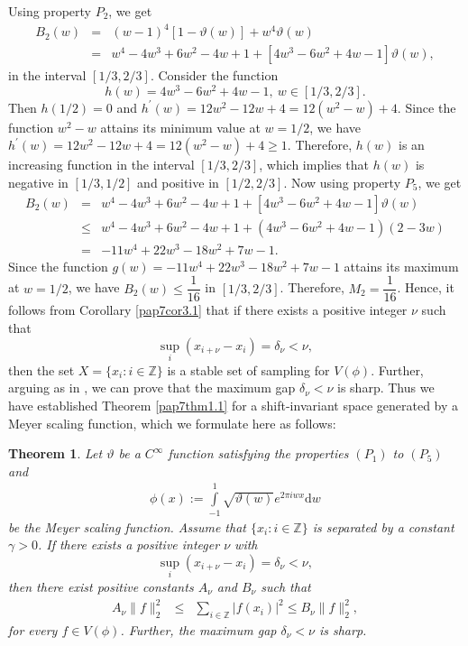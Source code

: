 \documentclass[a4paper,12pt,reqno]{amsart}
\theoremstyle{plain}
\newtheorem{thm}{Theorem}[section]
\numberwithin{equation}{section}
\theoremstyle{definition}
\newcommand{\ds}{\displaystyle}
\begin{document}
Using property $P_2$, we get
\begin{eqnarray*}
B_2(w)&=&(w-1)^{4}[1-\vartheta(w)]+ w^{4}\vartheta(w)\\
&=&w^4-4w^3+6w^2-4w+1+[4w^3-6w^2+4w-1]\vartheta(w),
\end{eqnarray*}
in the interval $[1/3, 2/3]$. Consider the function
$$h(w)=4w^3-6w^2+4w-1, ~w\in[1/3,2/3].$$
Then  $h(1/2)=0$ and $h^\prime(w)=12w^2-12w+4=12(w^2-w)+4$.
Since the function $w^2-w$ attains its minimum value at $w=1/2$, we have
$h^\prime(w)=12w^2-12w+4=12(w^2-w)+4\geq 1$. Therefore, $h(w)$ is an increasing function in the interval $[1/3, 2/3]$, which implies
that $h(w)$ is negative in $[1/3,1/2]$ and positive in $[1/2,2/3]$.
Now using property $P_5$, we get
\begin{eqnarray*}
B_2(w)&=&w^4-4w^3+6w^2-4w+1+[4w^3-6w^2+4w-1]\vartheta(w)\\
&\leq&w^4-4w^3+6w^2-4w+1+(4w^3-6w^2+4w-1)(2-3w)\\
&=&-11w^4+22w^3-18w^2+7w-1.
\end{eqnarray*}
Since the function
$g(w)=-11w^4+22w^3-18w^2+7w-1$ attains its maximum at $w=1/2$, we have $B_2(w)\leq \dfrac{1}{16}$ in $[1/3,2/3]$.
Therefore, $M_2=\dfrac{1}{16}$. Hence, it follows from Corollary \ref{pap7cor3.1} that if there exists a positive integer $\nu$ such that 
$$\sup\limits_i(x_{i+\nu}-x_i)=\delta_\nu<\nu,$$
then the set $X=\{x_i:i\in\mathbb{Z}\}$ is a stable set of sampling for $V(\phi)$.
Further, arguing as in \cite{AntoRad3}, we can prove that the maximum gap $\delta_\nu<\nu$ is sharp. 
Thus we have established  Theorem \ref{pap7thm1.1} for a shift-invariant space generated by a Meyer scaling function, which we formulate here as follows:
\begin{thm}\label{pap7thm3.7}
Let $\vartheta$  be a $C^\infty$ function satisfying the properties $(P_1)$ to $(P_5)$ and
\begin{eqnarray*}
\phi(x):=\displaystyle\int\limits_{-1}^{1}\sqrt{\vartheta(w)}e^{2\pi iw x}\mathrm{d}w
\end{eqnarray*}
be the Meyer scaling function. Assume that $\{x_i:{i\in\mathbb{Z}}\}$ is separated by a constant $\gamma>0$.
If there exists a positive integer $\nu$ with
$$\sup\limits_i(x_{i+\nu}-x_i)=\delta_\nu<\nu,$$
then there exist positive constants $A_\nu$ and $B_\nu$ such that
\begin{eqnarray}\label{pap3eqn2.7}
A_\nu\| f\|_2^2&\leq&\ds\sum\limits_{i\in\mathbb{Z}}|f(x_i)|^2\leq B_\nu\| f\|_2^2,
\end{eqnarray}
for every $f\in V(\phi)$.  Further, the maximum gap  $\delta_\nu<\nu$  is sharp. 
\end{thm}
 
\end{document}
